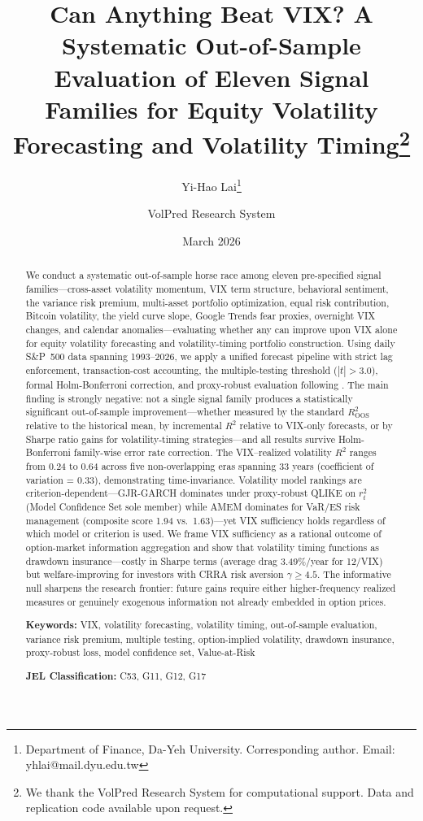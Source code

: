 \documentclass[12pt,a4paper]{article}
\title{Can Anything Beat VIX? A Systematic Out-of-Sample Evaluation of Eleven Signal Families for Equity Volatility Forecasting and Volatility Timing\thanks{We thank the VolPred Research System for computational support. Data and replication code available upon request.}}
\author{Yi-Hao Lai\thanks{Department of Finance, Da-Yeh University. Corresponding author. Email: yhlai@mail.dyu.edu.tw} \and VolPred Research System}
\date{March 2026}
\begin{document}
\maketitle

\begin{abstract}
\noindent
We conduct a systematic out-of-sample horse race among eleven pre-specified signal families---cross-asset volatility momentum, VIX term structure, behavioral sentiment, the variance risk premium, multi-asset portfolio optimization, equal risk contribution, Bitcoin volatility, the yield curve slope, Google Trends fear proxies, overnight VIX changes, and calendar anomalies---evaluating whether any can improve upon VIX alone for equity volatility forecasting and volatility-timing portfolio construction. Using daily S\&P~500 data spanning 1993--2026, we apply a unified forecast pipeline with strict lag enforcement, transaction-cost accounting, the \citet{harvey2016} multiple-testing threshold ($|t|>3.0$), formal Holm-Bonferroni correction, and proxy-robust evaluation following \citet{patton2011}. The main finding is strongly negative: not a single signal family produces a statistically significant out-of-sample improvement---whether measured by the standard \citet{campbell2008} $R^2_{\text{OOS}}$ relative to the historical mean, by incremental $R^2$ relative to VIX-only forecasts, or by Sharpe ratio gains for volatility-timing strategies---and all results survive Holm-Bonferroni family-wise error rate correction. The VIX--realized volatility $R^2$ ranges from 0.24 to 0.64 across five non-overlapping eras spanning 33 years (coefficient of variation = 0.33), demonstrating time-invariance. Volatility model rankings are criterion-dependent---GJR-GARCH dominates under proxy-robust QLIKE on $r_t^2$ (Model Confidence Set sole member) while AMEM dominates for VaR/ES risk management (composite score 1.94 vs.\ 1.63)---yet VIX sufficiency holds regardless of which model or criterion is used. We frame VIX sufficiency as a rational outcome of option-market information aggregation and show that volatility timing functions as drawdown insurance---costly in Sharpe terms (average drag 3.49\%/year for 12/VIX) but welfare-improving for investors with CRRA risk aversion $\gamma \geq 4.5$. The informative null sharpens the research frontier: future gains require either higher-frequency realized measures or genuinely exogenous information not already embedded in option prices.

\medskip
\noindent
\textbf{Keywords:} VIX, volatility forecasting, volatility timing, out-of-sample evaluation, variance risk premium, multiple testing, option-implied volatility, drawdown insurance, proxy-robust loss, model confidence set, Value-at-Risk

\medskip
\noindent
\textbf{JEL Classification:} C53, G11, G12, G17
\end{abstract}
\end{document}
